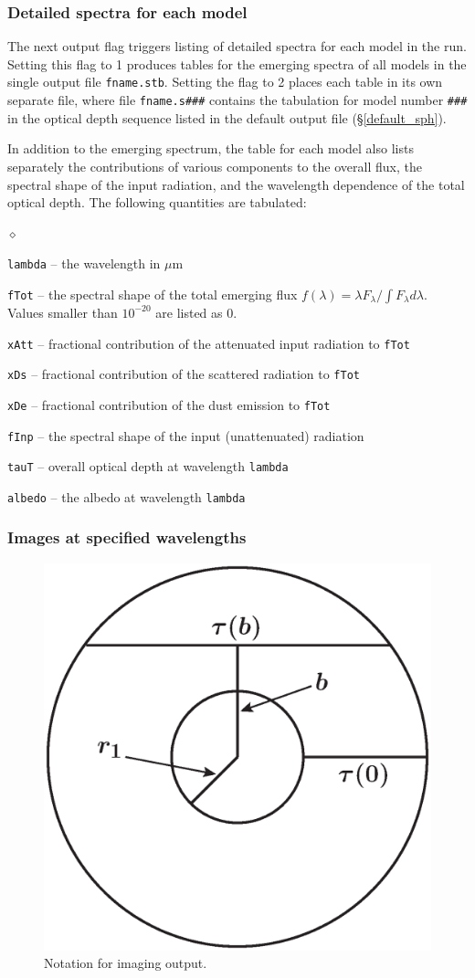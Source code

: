 \documentclass[11pt]{article}
\def\E#1{\hbox{$10^{#1}$}}
\def\mic    {\hbox{$\mu$m}}
\begin{document}
\subsubsection  {Detailed spectra for each model}
\label{fname.s}

The next output flag triggers listing of detailed spectra for each model in the
run.  Setting this flag to 1 produces tables for the emerging spectra of all
models in the single output file {\tt fname.stb}.  Setting the flag to 2 places
each table in its own separate file, where file {\tt fname.s\#\#\#} contains
the tabulation for model number {\tt \#\#\#} in the optical depth sequence
listed in the default output file (\S\ref{default_sph}).

In addition to the emerging spectrum, the table for each model also lists
separately the contributions of various components to the overall flux, the
spectral shape of the input radiation, and the wavelength dependence of the
total optical depth. The following quantities are tabulated:
\begin{list}{$\diamond$}{}
\item {\tt lambda} -- the wavelength in \mic
\item
{\tt fTot} -- the spectral shape of the total emerging flux $f(\lambda) =
\lambda F_\lambda/\int\!F_\lambda d\lambda$.  Values smaller than \E{-20} are
listed as 0.
\item{\tt xAtt} -- fractional contribution of the attenuated input radiation
to {\tt fTot}
\item{\tt xDs} -- fractional contribution of the scattered radiation to
{\tt fTot}
\item{\tt xDe} -- fractional contribution of the dust emission to {\tt fTot}
\item{\tt fInp} -- the spectral shape of the input (unattenuated) radiation
\item{\tt tauT} -- overall optical depth at wavelength {\tt lambda}
\item{\tt albedo} -- the albedo at wavelength {\tt lambda}

\end{list}

\subsubsection{Images at specified wavelengths}
\label{imaging}

\begin{figure}[ht]
\centering
    \includegraphics[width=0.40\hsize]{figure1.eps}
\caption{Notation for imaging output.}
\label{impact parameter}
\end{figure}
\end{document}
